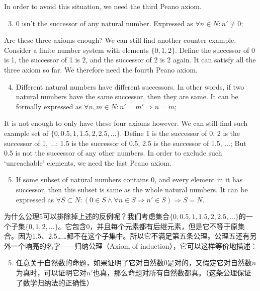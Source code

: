 \documentclass[UTF8]{article}
\begin{document}
In order to avoid this situation, we need the third Peano axiom.

\begin{enumerate}
  \setcounter{enumi}{2}
  \item 0 isn't the successor of any natural number. Expressed as $\forall n \in N: n' \neq 0$;
\end{enumerate}

Are these three axioms enough? We can still find another counter example. Consider a finite number system with elements $\{0, 1, 2\}$. Define the successor of 0 is 1, the successor of 1 is 2, and the successor of 2 is 2 again. It can satisfy all the three axiom so far. We therefore need the fourth Peano axiom.

\begin{enumerate}
  \setcounter{enumi}{3}
  \item Different natural numbers have different successors. In other words, if two natural numbers have the same successor, then they are same. It can be formally expressed as $\forall n, m \in N: n' = m' \Rightarrow n = m$;
\end{enumerate}

It is not enough to only have these four axioms however. We can still find such example set of $\{0, 0.5, 1, 1.5, 2, 2.5, ...\}$. Define 1 is the successor of 0, 2 is the successor of 1, ...; 1.5 is the successor of 0.5, 2.5 is the successor of 1.5, ...; But 0.5 is not the successor of any other numbers. In order to exclude such `unreachable' elements, we need the last Peano axiom.

\begin{enumerate}
  \setcounter{enumi}{4}
  \item If some subset of natural numbers contains 0, and every element in it has successor, then this subset is same as the whole natural numbers. It can be expressed as $\forall S \subset N: (0 \in S \land \forall n \in S \Rightarrow n' \in S) \Rightarrow S = N$.
\end{enumerate}

为什么公理5可以排除掉上述的反例呢？我们考虑集合$\{0, 0.5, 1, 1.5, 2, 2.5, ...\}$的一个子集$\{0, 1, 2, ...\}$。它包含0，并且每个元素都有后继元素，但是它不等于原集合。因为1.5、2.5……都不在这个子集中。所以它不满足第五条公理。公理五还有另外一个响亮的名字——归纳公理（Axiom of induction），它可以这样等价地描述：

\begin{enumerate}
  \setcounter{enumi}{4}
  \item 任意关于自然数的命题，如果证明了它对自然数0是对的，又假定它对自然数$n$为真时，可以证明它对$n'$也真，那么命题对所有自然数都真。（这条公理保证了数学归纳法的正确性）
\end{enumerate}
\end{document}
